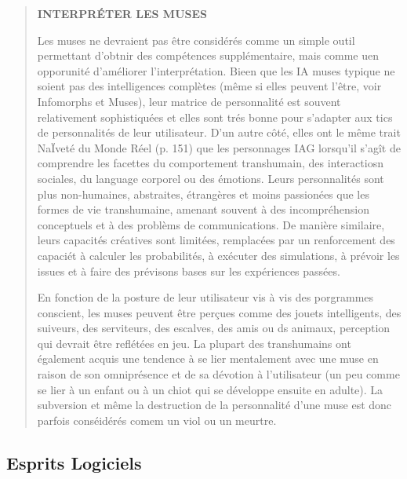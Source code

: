 \begin{quotation} \textbf{INTERPRÉTER LES MUSES} 

Les muses ne devraient pas être considérés comme un simple outil permettant d'obtnir des compétences supplémentaire, mais comme uen opporunité d'améliorer l'interprétation. Bieen que les IA muses typique ne soient pas des intelligences complètes (même si elles peuvent l'être, voir Infomorphs et Muses), leur matrice de personnalité est souvent relativement sophistiquées et elles sont trés bonne pour s'adapter aux tics de personnalités de leur utilisateur. D'un autre côté, elles ont le même trait NaÏveté du Monde Réel (p. 151) que les personnages IAG lorsqu'il s'agît de comprendre les facettes du comportement transhumain, des interactiosn sociales, du language corporel ou des émotions. Leurs personnalités sont plus non-humaines, abstraites, étrangères et moins passionées que les formes de vie transhumaine, amenant souvent à des incompréhension conceptuels et à des problèms de communications. De manière similaire, leurs capacités créatives sont limitées, remplacées par un renforcement des capaciét à calculer les probabilités, à exécuter des simulations, à prévoir les issues et à faire des prévisons bases sur les expériences passées. 

En fonction de la posture de leur utilisateur vis à vis des porgrammes conscient, les muses peuvent être perçues comme des jouets intelligents, des suiveurs, des serviteurs, des escalves, des amis ou ds animaux, perception qui devrait être reflétées en jeu. La plupart des transhumains ont également acquis une tendence à se lier mentalement avec une muse en raison de son omniprésence et de sa dévotion à l'utilisateur (un peu comme se lier à un enfant ou à un chiot qui se développe ensuite en adulte). La subversion et même la destruction de la personnalité d'une muse est donc parfois conséidérés comem un viol ou un meurtre. \end{quotation} 



\subsection{Esprits Logiciels} 

